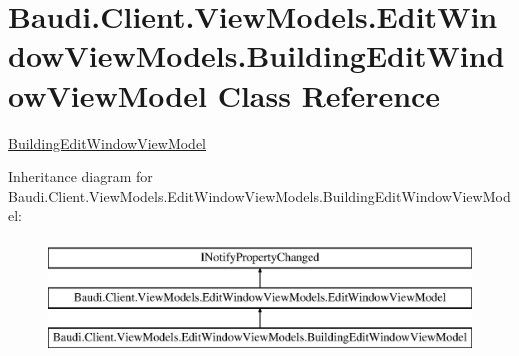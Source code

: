 \hypertarget{class_baudi_1_1_client_1_1_view_models_1_1_edit_window_view_models_1_1_building_edit_window_view_model}{}\section{Baudi.\+Client.\+View\+Models.\+Edit\+Window\+View\+Models.\+Building\+Edit\+Window\+View\+Model Class Reference}
\label{class_baudi_1_1_client_1_1_view_models_1_1_edit_window_view_models_1_1_building_edit_window_view_model}


\hyperlink{class_baudi_1_1_client_1_1_view_models_1_1_edit_window_view_models_1_1_building_edit_window_view_model}{Building\+Edit\+Window\+View\+Model}  


Inheritance diagram for Baudi.\+Client.\+View\+Models.\+Edit\+Window\+View\+Models.\+Building\+Edit\+Window\+View\+Model\+:\begin{figure}[H]
\begin{center}
\leavevmode
\includegraphics[height=3.000000cm]{class_baudi_1_1_client_1_1_view_models_1_1_edit_window_view_models_1_1_building_edit_window_view_model}
\end{center}
\end{figure}
